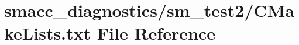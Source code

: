 \hypertarget{diagnostics_2sm__test2_2CMakeLists_8txt}{}\section{smacc\+\_\+diagnostics/sm\+\_\+test2/\+C\+Make\+Lists.txt File Reference}
\label{diagnostics_2sm__test2_2CMakeLists_8txt}
